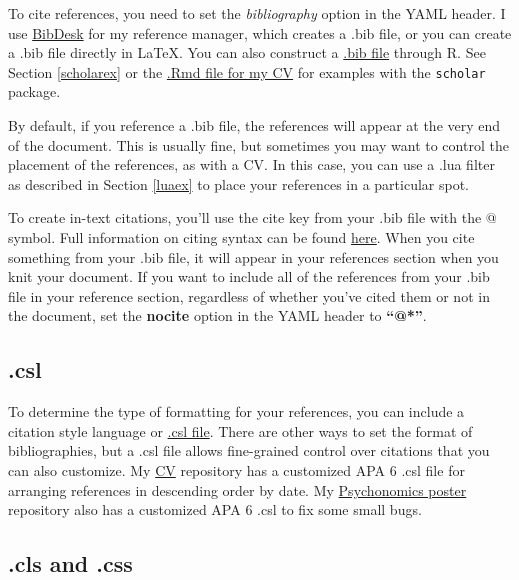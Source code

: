 \documentclass[
]{book}
\begin{document}
To cite references, you need to set the \emph{bibliography} option in the YAML header. I use \href{https://bibdesk.sourceforge.io/}{BibDesk} for my reference manager, which creates a .bib file, or you can create a .bib file directly in LaTeX. You can also construct a \href{https://rmarkdown.rstudio.com/authoring_bibliographies_and_citations.html}{.bib file} through R. See Section \ref{scholarex} or the \href{https://github.com/hollzzar/zaharchuk-cv/blob/master/Zaharchuk_CV.Rmd}{.Rmd file for my CV} for examples with the \texttt{scholar} package.

By default, if you reference a .bib file, the references will appear at the very end of the document. This is usually fine, but sometimes you may want to control the placement of the references, as with a CV. In this case, you can use a .lua filter as described in Section \ref{luaex} to place your references in a particular spot.

To create in-text citations, you'll use the cite key from your .bib file with the @ symbol. Full information on citing syntax can be found \href{https://rmarkdown.rstudio.com/authoring_bibliographies_and_citations.html\#citation_syntax}{here}. When you cite something from your .bib file, it will appear in your references section when you knit your document. If you want to include all of the references from your .bib file in your reference section, regardless of whether you've cited them or not in the document, set the \textbf{nocite} option in the YAML header to \textbf{``@*''}.

\hypertarget{csl}{%
\subsection{.csl}\label{csl}}

To determine the type of formatting for your references, you can include a citation style language or \href{https://github.com/citation-style-language/styles}{.csl file}. There are other ways to set the format of bibliographies, but a .csl file allows fine-grained control over citations that you can also customize. My \href{https://github.com/hollzzar/zaharchuk-cv}{CV} repository has a customized APA 6 .csl file for arranging references in descending order by date. My \href{https://github.com/hollzzar/psychonomics-poster}{Psychonomics poster} repository also has a customized APA 6 .csl to fix some small bugs.

\hypertarget{cls-and-.css}{%
\subsection{.cls and .css}\label{cls-and-.css}}
\end{document}
